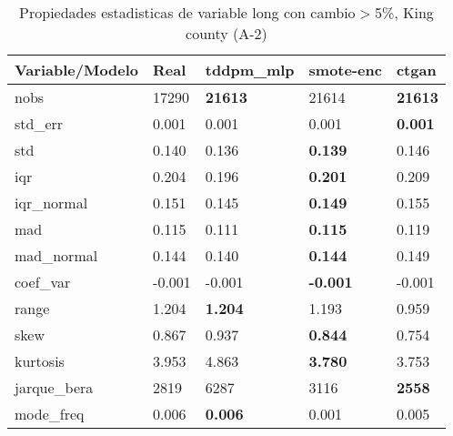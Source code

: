 \begin{table}[H]
\centering
\fontsize{8}{14}\selectfont
\caption{Propiedades estadisticas de variable long con cambio\ensuremath{>}5\%, King county (A-2)}
\label{table-stats-king county-a-2-long-short}
\begin{tabular}{|l|m{10em}|m{10em}|m{10em}|m{10em}|}
\hline
 \rowcolor[gray]{0.8}
Variable/Modelo & Real & tddpm\_mlp & smote-enc & ctgan \\
\hline nobs & 17290 & \bfseries 21613 & \cellcolor[rgb]{0.9, 0.54, 0.52} 21614 & \bfseries 21613 \\
\hline std\_err & 0.001 & \cellcolor[rgb]{0.9, 0.54, 0.52} 0.001 & 0.001 & \bfseries 0.001 \\
\hline std & 0.140 & 0.136 & \bfseries 0.139 & \cellcolor[rgb]{0.9, 0.54, 0.52} 0.146 \\
\hline iqr & 0.204 & \cellcolor[rgb]{0.9, 0.54, 0.52} 0.196 & \bfseries 0.201 & 0.209 \\
\hline iqr\_normal & 0.151 & \cellcolor[rgb]{0.9, 0.54, 0.52} 0.145 & \bfseries 0.149 & 0.155 \\
\hline mad & 0.115 & \cellcolor[rgb]{0.9, 0.54, 0.52} 0.111 & \bfseries 0.115 & 0.119 \\
\hline mad\_normal & 0.144 & \cellcolor[rgb]{0.9, 0.54, 0.52} 0.140 & \bfseries 0.144 & 0.149 \\
\hline coef\_var & -0.001 & -0.001 & \bfseries -0.001 & \cellcolor[rgb]{0.9, 0.54, 0.52} -0.001 \\
\hline range & 1.204 & \bfseries 1.204 & 1.193 & \cellcolor[rgb]{0.9, 0.54, 0.52} 0.959 \\
\hline skew & 0.867 & 0.937 & \bfseries 0.844 & \cellcolor[rgb]{0.9, 0.54, 0.52} 0.754 \\
\hline kurtosis & 3.953 & \cellcolor[rgb]{0.9, 0.54, 0.52} 4.863 & \bfseries 3.780 & 3.753 \\
\hline jarque\_bera & 2819 & \cellcolor[rgb]{0.9, 0.54, 0.52} 6287 & 3116 & \bfseries 2558 \\
\hline mode\_freq & 0.006 & \bfseries 0.006 & \cellcolor[rgb]{0.9, 0.54, 0.52} 0.001 & 0.005 \\
\hline
\end{tabular}
\end{table}

